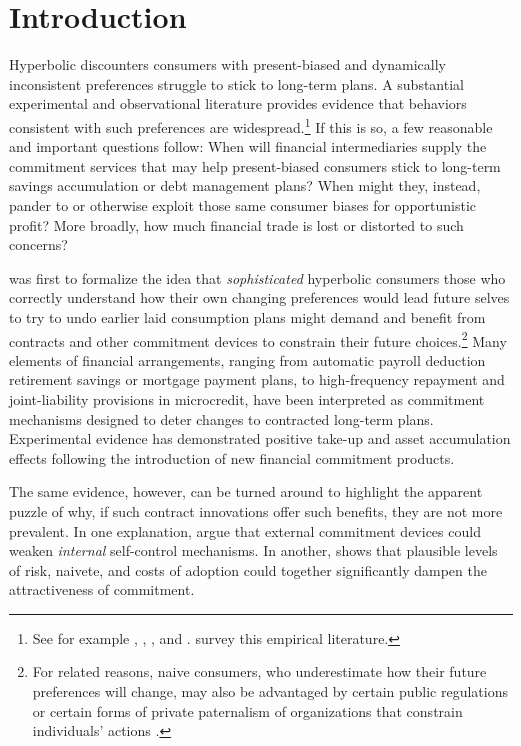 \documentclass[11pt,english]{article}
\theoremstyle{plain}
\theoremstyle{definition}
\begin{document}
\section{Introduction}

Hyperbolic discounters \textendash{} consumers with present-biased and dynamically inconsistent preferences \textendash{} struggle to stick to long-term plans. A substantial experimental and observational literature provides evidence that behaviors consistent with such preferences are widespread.\footnote{See for example \citet{ariely2002}, \citet{thaler2004}, \citet{ashraf2006}, and \citet{bauer2012}. \citet{bryan2010}
survey this empirical literature.} If this is so, a few reasonable and important questions follow: When will financial intermediaries supply the commitment services that may help present-biased consumers stick to long-term savings accumulation or debt management plans? When might they, instead, pander to or otherwise exploit those same consumer biases for opportunistic profit? More broadly, how much financial trade is lost or distorted to such concerns?

\citet{strotz1956} was first to formalize the idea that \emph{sophisticated} hyperbolic consumers \textendash{} those who correctly understand how their own changing preferences would lead future selves to try to undo earlier laid consumption plans \textendash{} might demand and benefit from contracts and other commitment devices to constrain
their future choices.\footnote{For related reasons, naive consumers, who underestimate how their future preferences will change, may also be advantaged by certain public regulations or certain forms of private paternalism of organizations that constrain individuals' actions \citep{spiegler2011}.} Many elements of financial arrangements, ranging from automatic payroll deduction retirement savings or mortgage payment plans, to high-frequency
repayment and joint-liability provisions in microcredit, have  been interpreted as commitment mechanisms designed to deter changes to contracted long-term plans. Experimental
evidence has demonstrated positive take-up and asset accumulation effects following the introduction of new financial commitment products.

The same evidence, however, can be turned around to highlight the apparent puzzle of why, if such contract innovations offer such benefits, they are not more prevalent. In one explanation, \citet{bernheim2015} argue that external commitment devices could weaken \emph{internal} self-control mechanisms. In another, \citet{laibson2015} shows that plausible levels of risk, naivete, and costs of adoption could together significantly dampen the attractiveness of commitment.
\end{document}
